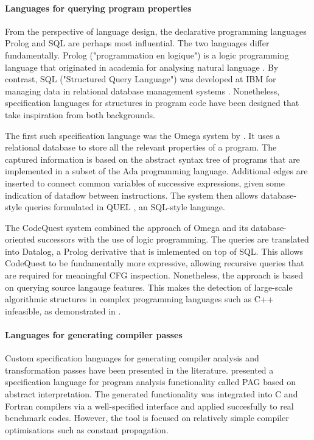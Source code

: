     \paragraph*{Languages for querying program properties}
    From the perspective of language design, the declarative programming
    languages Prolog and SQL are perhaps most influential.
    The two languages differ fundamentally.
    Prolog ("programmation en logique") is a logic programming language that
    originated in academia for analysing natural language
    \citep{Colmerauer:1993:BP:154766.155362}.
    By contrast, SQL ("Structured Query Language") was developed at IBM for
    managing data in relational database management systems
    \citep{Chamberlin:1974:SSE:800296.811515}.
    Nonetheless, specification languages for structures in program code have
    been designed that take inspiration from both backgrounds.

    The first such specification language was the Omega system by
    \citet{Linton:CSD-83-164}.
    It uses a relational database to store all the relevant properties of a
    program.
    The captured information is based on the abstract syntax tree of programs
    that are implemented in a subset of the Ada programming language.
    Additional edges are inserted to connect common variables of
    successive expressions, given some indication of dataflow between
    instructions.
    The system then allows database-style queries formulated in QUEL
    \citep{Stonebraker:1976:DII:320473.320476}, an SQL-style language.

    The CodeQuest system \citep{Hajiyev:2006:CSS:2171327.2171331} combined the
    approach of Omega and its database-oriented successors with the use of logic
    programming.
    The queries are translated into Datalog, a Prolog derivative that is
    imlemented on top of SQL.
    This allows CodeQuest to be fundamentally more expressive, allowing
    recursive queries that are required for meaningful CFG inspection.
    Nonetheless, the approach is based on querying source langauge features.
    This makes the detection of large-scale algorithmic structures in complex
    programming languages such as C++ infeasible, as demonstrated in
    .

    \paragraph*{Languages for generating compiler passes}
    Custom specification languages for generating compiler analysis and
    transformation passes have been presented in the literature.
    \citet{Martin1998} presented a specification language for program analysis
    functionality called PAG based on abstract interpretation.
    The generated functionality was integrated into C and Fortran compilers via
    a well-specified interface and applied succesfully to real benchmark codes.
    However, the tool is focused on relatively simple compiler optimisations
    such as constant propagation.


